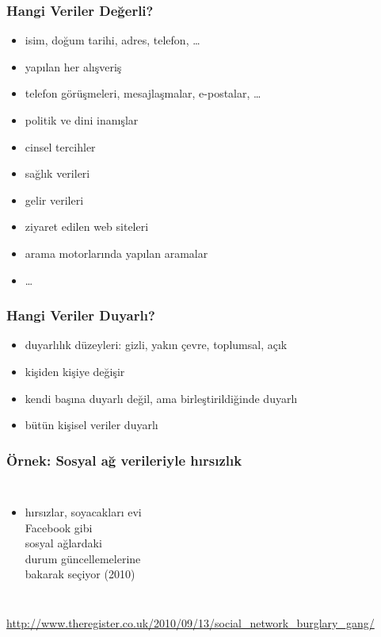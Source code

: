 \documentclass[dvipsnames]{beamer}
\theoremstyle{definition}
\theoremstyle{example}
\theoremstyle{plain}
\begin{document}
\begin{frame}
  \frametitle{Hangi Veriler Değerli?}

  \begin{itemize}
    \item isim, doğum tarihi, adres, telefon, \ldots
    \item yapılan her alışveriş
    \item telefon görüşmeleri, mesajlaşmalar, e-postalar, \ldots
    \item politik ve dini inanışlar
    \item cinsel tercihler
    \item sağlık verileri
    \item gelir verileri
    \item ziyaret edilen web siteleri
    \item arama motorlarında yapılan aramalar
    \item \ldots
  \end{itemize}
\end{frame}

\begin{frame}
  \frametitle{Hangi Veriler Duyarlı?}

  \begin{itemize}
    \item duyarlılık düzeyleri: gizli, yakın çevre, toplumsal, açık
    \item kişiden kişiye değişir
    \item kendi başına duyarlı değil, ama birleştirildiğinde duyarlı

    \bigskip
    \item bütün kişisel veriler duyarlı
  \end{itemize}
\end{frame}

\begin{frame}
  \frametitle{Örnek: Sosyal ağ verileriyle hırsızlık}

  \begin{columns}

    \begin{itemize}
      \item hırsızlar, soyacakları evi\\
        Facebook gibi\\
        sosyal ağlardaki\\
        durum güncellemelerine\\
        bakarak seçiyor (2010)
    \end{itemize}
  \end{columns}

  \medskip
  \tiny{\url{http://www.theregister.co.uk/2010/09/13/social_network_burglary_gang/}}\\
\end{frame}
\end{document}
